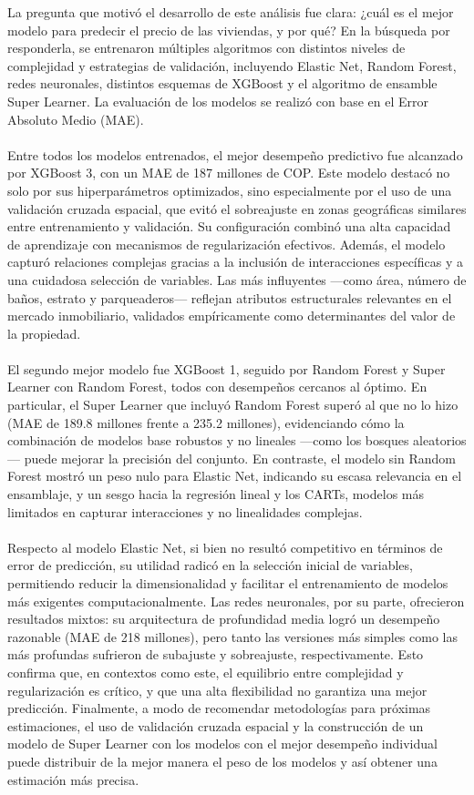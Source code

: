\documentclass[article,11 pt]{article}
\begin{document}
La pregunta que motivó el desarrollo de este análisis fue clara: ¿cuál es el mejor modelo para predecir el precio de las viviendas, y por qué? En la búsqueda por responderla, se entrenaron múltiples algoritmos con distintos niveles de complejidad y estrategias de validación, incluyendo Elastic Net, Random Forest, redes neuronales, distintos esquemas de XGBoost y el algoritmo de ensamble Super Learner. La evaluación de los modelos se realizó con base en el Error Absoluto Medio (MAE).
\\
\\
Entre todos los modelos entrenados, el mejor desempeño predictivo fue alcanzado por XGBoost 3, con un MAE de 187 millones de COP. Este modelo destacó no solo por sus hiperparámetros optimizados, sino especialmente por el uso de una validación cruzada espacial, que evitó el sobreajuste en zonas geográficas similares entre entrenamiento y validación. Su configuración combinó una alta capacidad de aprendizaje con mecanismos de regularización efectivos. Además, el modelo capturó relaciones complejas gracias a la inclusión de interacciones específicas y a una cuidadosa selección de variables. Las más influyentes —como área, número de baños, estrato y parqueaderos— reflejan atributos estructurales relevantes en el mercado inmobiliario, validados empíricamente como determinantes del valor de la propiedad.
\\
\\
El segundo mejor modelo fue XGBoost 1, seguido por Random Forest y Super Learner con Random Forest, todos con desempeños cercanos al óptimo. En particular, el Super Learner que incluyó Random Forest superó al que no lo hizo (MAE de 189.8 millones frente a 235.2 millones), evidenciando cómo la combinación de modelos base robustos y no lineales —como los bosques aleatorios— puede mejorar la precisión del conjunto. En contraste, el modelo sin Random Forest mostró un peso nulo para Elastic Net, indicando su escasa relevancia en el ensamblaje, y un sesgo hacia la regresión lineal y los CARTs, modelos más limitados en capturar interacciones y no linealidades complejas.
\\
\\
Respecto al modelo Elastic Net, si bien no resultó competitivo en términos de error de predicción, su utilidad radicó en la selección inicial de variables, permitiendo reducir la dimensionalidad y facilitar el entrenamiento de modelos más exigentes computacionalmente. Las redes neuronales, por su parte, ofrecieron resultados mixtos: su arquitectura de profundidad media logró un desempeño razonable (MAE de 218 millones), pero tanto las versiones más simples como las más profundas sufrieron de subajuste y sobreajuste, respectivamente. Esto confirma que, en contextos como este, el equilibrio entre complejidad y regularización es crítico, y que una alta flexibilidad no garantiza una mejor predicción. Finalmente, a modo de recomendar metodologías para próximas estimaciones, el uso de validación cruzada espacial y la construcción de un modelo de Super Learner con los modelos con el mejor desempeño individual puede distribuir de la mejor manera el peso de los modelos y así obtener una estimación más precisa.
\end{document}
